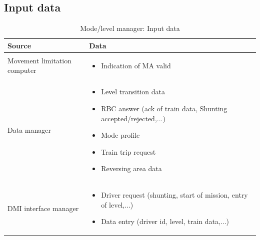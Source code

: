 \documentclass[nocc]{template/openetcs_report}
\begin{document}
\subsection{Input data}
			\begin{longtable}{|l|l|}
				\caption{Mode/level manager: Input data}\\ 
				\hline
				
					\begin{minipage}[t]{0.35\linewidth} \textbf{Source}	\end{minipage} 
				&	\begin{minipage}[t]{0.65\linewidth} \textbf{Data} \end{minipage} \\
				
				\hline
																																									
					\begin{minipage}[t]{0.35\linewidth} Movement limitation computer	\end{minipage} 
				&	\begin{minipage}[t]{0.65\linewidth}
						\begin{itemize}
							\item Indication of MA valid 
						\end{itemize}
					\end{minipage} \\
				
				\hline
				
					\begin{minipage}[t]{0.35\linewidth} Data manager	\end{minipage} 
				&	\begin{minipage}[t]{0.65\linewidth}
						\begin{itemize}
							\item Level transition data
							\item RBC answer (ack of train data, Shunting accepted/rejected,...)
							\item Mode profile
							\item Train trip request
							\item Reversing area data
						\end{itemize}			
					\end{minipage} \\
				
				\hline
					
					\begin{minipage}[t]{0.35\linewidth} DMI interface manager	\end{minipage} 
				&	\begin{minipage}[t]{0.65\linewidth}
						\begin{itemize}
							\item Driver request (shunting, start of mission, entry of level,...)
							\item Data entry (driver id, level, train data,...)
						\end{itemize}			
					\end{minipage} \\
				

\end{longtable}
\end{document}
